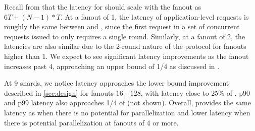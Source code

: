 Recall from  that the latency for \system{} should scale with the fanout as $6T + (N-1)*T$. At a fanout of 1, the latency of application-level requests is roughly the same between \system{} and \mpaxos{}, since the first request in a set of concurrent requests issued to \system{} only requires a single round. Similarly, at a fanout of 2, the latencies are also similar due to the 2-round nature of the protocol for fanouts higher than 1. We expect to see significant latency improvements as the fanout increases past 4, approaching an upper bound of 1/4 as discussed in .

%
At 9 shards, we notice latency approaches the lower bound improvement
described in \cref{sec:design} for fanouts $16$ - $128$, with latency
close to 25\% of \mpaxos{}. p90 and p99 latency also approaches 1/4 of \mpaxos{} (not shown).
%
Overall, \sys{} provides the same latency as \mpaxos{} when there is no potential for parallelization and lower latency when there is potential parallelization at fanouts of 4 or more.



